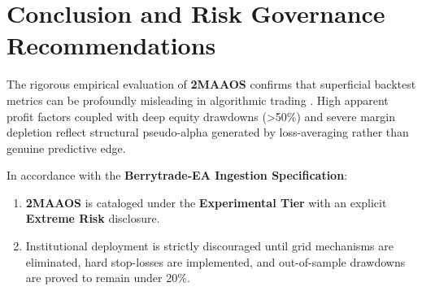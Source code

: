 \documentclass[11pt,a4paper]{article}
\begin{document}
\section{Conclusion and Risk Governance Recommendations}
The rigorous empirical evaluation of \textbf{2MAAOS} confirms that superficial backtest metrics can be profoundly misleading in algorithmic trading \cite{artsu2026illusion, lopez2018advances}. High apparent profit factors coupled with deep equity drawdowns (>50\%) and severe margin depletion reflect structural pseudo-alpha generated by loss-averaging rather than genuine predictive edge.

In accordance with the \textbf{Berrytrade-EA Ingestion Specification}:
\begin{enumerate}
    \item \textbf{2MAAOS} is cataloged under the \textbf{Experimental Tier} with an explicit \textbf{Extreme Risk} disclosure.
    \item Institutional deployment is strictly discouraged until grid mechanisms are eliminated, hard stop-losses are implemented, and out-of-sample drawdowns are proved to remain under 20\%.
\end{enumerate}



\end{document}
